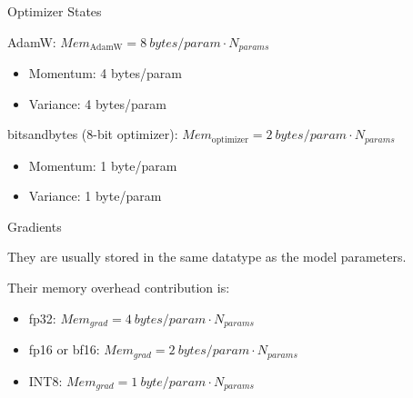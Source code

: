 \documentclass[11pt,compress,t,notes=noshow, xcolor=table]{beamer}
\begin{document}

\begin{vbframe}{Optimizer States}

\vfill

AdamW: $Mem_{\text{AdamW}} = 8 ~bytes/param \cdot N_{params}$
\begin{itemize}
    \item Momentum: 4 bytes/param
	\item Variance: 4 bytes/param
\end{itemize}

\vskip3mm

bitsandbytes (8-bit optimizer): $Mem_{\text{optimizer}} = 2 ~bytes/param \cdot N_{params}$
\begin{itemize}
    \item Momentum: 1 byte/param
	\item Variance: 1 byte/param
\end{itemize}

\vskip3mm



\vfill

\end{vbframe}


\begin{vbframe}{Gradients}

\vfill

They are usually stored in the same datatype as the model parameters. \newline

Their memory overhead contribution is: \newline

\begin{itemize}
 	\item fp32: $Mem_{grad} = 4 ~bytes/param \cdot N_{params}$
 	\item fp16 or bf16: $Mem_{grad} = 2 ~bytes/param \cdot N_{params}$
	\item INT8: $Mem_{grad} = 1 ~byte/param \cdot N_{params}$
\end{itemize}

\vfill

\end{vbframe}
\end{document}

